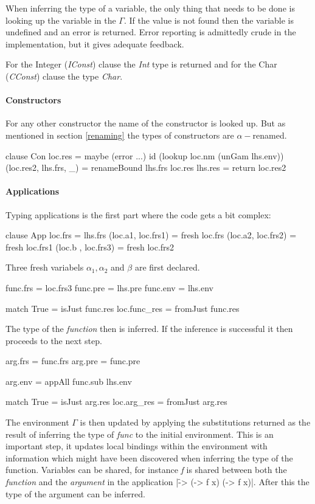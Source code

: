 When inferring the type of a variable, the only thing that needs to be done is looking up the variable in the $\Gamma$. If the value is not found then the variable is undefined and an error is returned. Error reporting is admittedly crude in the implementation, but it gives adequate feedback.

For the Integer (\emph{IConst}) clause the \emph{Int} type is returned and for the Char (\emph{CConst}) clause the type \emph{Char}.

\paragraph{Constructors}
For any other constructor the name of the constructor is looked up. But as mentioned in section \ref{renaming} the types of constructors are $\alpha-$renamed.

\begin{code}
clause Con
   loc.res = maybe (error ...) id (lookup loc.nm (unGam lhs.env))
   (loc.res2, lhs.frs, _) = renameBound lhs.frs loc.res
   lhs.res = return loc.res2
\end{code}

\paragraph{Applications}
Typing applications is the first part where the code gets a bit complex:

\begin{code}
clause App
   loc.frs              = lhs.frs
   (loc.a1,  loc.frs1)  = fresh loc.frs
   (loc.a2,  loc.frs2)  = fresh loc.frs1
   (loc.b ,  loc.frs3)  = fresh loc.frs2
\end{code}
Three fresh variabels $\alpha_1, \alpha_2$ and $\beta$ are first declared.

\begin{code}
func.frs = loc.frs3
func.pre = lhs.pre
func.env = lhs.env
    
match True    = isJust func.res       
loc.func_res  = fromJust func.res
\end{code}
The type of the \emph{function} then is inferred. If the inference is successful  it then proceeds to the next step.

\begin{code}       
arg.frs = func.frs
arg.pre = func.pre
    
arg.env = appAll func.sub lhs.env
 
match True   = isJust arg.res   
loc.arg_res  = fromJust arg.res
\end{code}
The environment $\Gamma$ is then updated by applying the substitutions returned as the result of inferring the type of \emph{func} to the initial environment. This is an important step, it updates local bindings within the environment with information which might have been discovered when inferring the type of the function. Variables can be shared, for instance \emph{f} is shared between both the \emph{function} and the \emph{argument} in the application |\f -> (\x -> f x) (\x -> f x)|. After this the type of the argument can be inferred.
       
